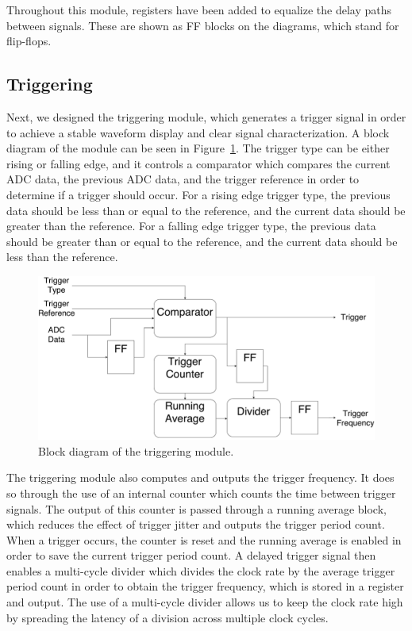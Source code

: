 \documentclass[journal]{IEEEtran}
\begin{document}
Throughout this module, registers have been added to equalize the delay paths between signals. These are shown as FF blocks on the diagrams, which stand for flip-flops.

\subsection{Triggering}

Next, we designed the triggering module, which generates a trigger signal in order to achieve a stable waveform display and clear signal characterization. A block diagram of the module can be seen in Figure~\ref{fig:triggering}. The trigger type can be either rising or falling edge, and it controls a comparator which compares the current ADC data, the previous ADC data, and the trigger reference in order to determine if a trigger should occur. For a rising edge trigger type, the previous data should be less than or equal to the reference, and the current data should be greater than the reference. For a falling edge trigger type, the previous data should be greater than or equal to the reference, and the current data should be less than the reference.

\begin{figure}[!htb]
  \centering
  \includegraphics[width=\columnwidth]{diagrams/triggering.pdf}
  \caption{Block diagram of the triggering module.}
  \label{fig:triggering}
\end{figure}

The triggering module also computes and outputs the trigger frequency. It does so through the use of an internal counter which counts the time between trigger signals. The output of this counter is passed through a running average block, which reduces the effect of trigger jitter and outputs the trigger period count. When a trigger occurs, the counter is reset and the running average is enabled in order to save the current trigger period count. A delayed trigger signal then enables a multi-cycle divider which divides the clock rate by the average trigger period count in order to obtain the trigger frequency, which is stored in a register and output. The use of a multi-cycle divider allows us to keep the clock rate high by spreading the latency of a division across multiple clock cycles.
\end{document}
